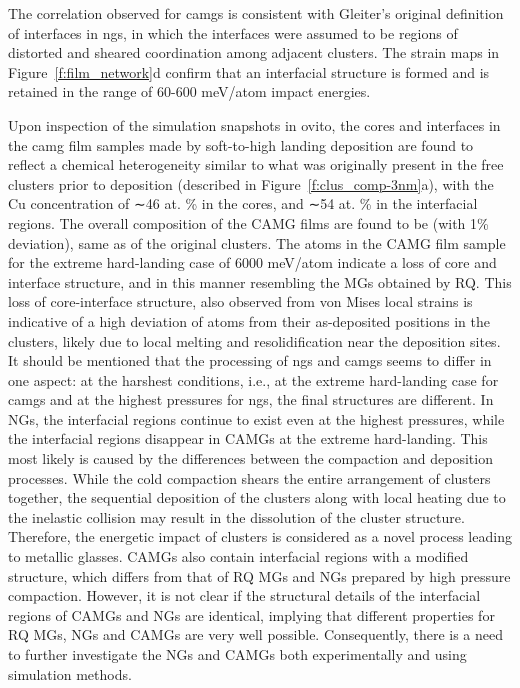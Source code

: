 \begin{changebar}
The correlation observed for \gls{camg}s is consistent with Gleiter’s original definition of interfaces \cite{Gleiter1991} in \gls{ng}s, in which the interfaces were assumed to be regions of distorted and sheared coordination among adjacent clusters. The strain maps in Figure~\ref{f:film_network}d confirm that an interfacial structure is formed and is retained in the range of 60-600 meV/atom impact energies.\par

Upon inspection of the simulation snapshots in \gls{ovito}, the cores and interfaces in the \gls{camg} film samples made by soft-to-high landing deposition are found to reflect a chemical heterogeneity similar to what was originally present in the free clusters prior to deposition (described in Figure~\ref{f:clus_comp-3nm}a), with the Cu concentration of ∼46 at. \% in the cores, and ∼54 at. \% in the interfacial regions. The overall composition of the CAMG films are found to be \cz (with 1\% deviation), same as of the original clusters. The atoms in the CAMG film sample for the extreme hard-landing case of 6000 meV/atom indicate a loss of core and interface structure, and in this manner resembling the MGs obtained by RQ. This loss of core-interface structure, also observed from von Mises local strains is indicative of a high deviation of atoms from their as-deposited positions in the clusters, likely due to local melting and resolidification near the deposition sites. It should be mentioned that the processing of \gls{ng}s and \gls{camg}s seems to differ in one aspect: at the harshest conditions, i.e., at the extreme hard-landing case for \gls{camg}s and at the highest pressures for \gls{ng}s, the final structures are different. In NGs, the interfacial regions continue to exist even at the highest pressures, while the interfacial regions disappear in CAMGs at the extreme hard-landing. This most likely is caused by the differences between the
compaction and deposition processes. While the cold compaction shears the entire arrangement of clusters together, the sequential deposition of the clusters along with local heating due to the inelastic collision may result in the dissolution of the cluster structure. Therefore, the energetic impact of clusters is considered as a novel process leading to metallic glasses. CAMGs also contain interfacial regions with a modified structure, which differs from that of RQ MGs and NGs prepared by high pressure compaction. However, it is not clear if the structural details of the interfacial regions of CAMGs and NGs are identical, implying that different properties for RQ MGs, NGs and CAMGs are very well possible. Consequently, there is a need to further investigate the NGs and CAMGs both experimentally and using simulation methods. \par


\end{changebar}
